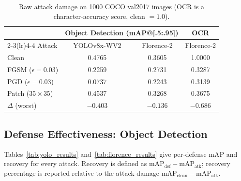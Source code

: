 \documentclass[10pt,twocolumn,letterpaper]{article}
\begin{document}
\begin{table}[t]
\centering
\small
\setlength{\tabcolsep}{4pt}
\begin{tabular}{lccc}
\toprule
 & \multicolumn{2}{c}{Object Detection (mAP@[.5:.95])} & OCR \\
\cmidrule(lr){2-3}\cmidrule(lr){4-4}
Attack & YOLOv8x-WV2 & Florence-2 & Florence-2 \\
\midrule
Clean              & 0.4765 & 0.3605 & 1.0000 \\
FGSM ($\epsilon{=}0.03$) & 0.2259 & 0.2731 & 0.3287 \\
PGD ($\epsilon{=}0.03$)  & 0.0737 & 0.2243 & 0.3139 \\
Patch ($35{\times}35$)   & 0.4537 & 0.3268 & 0.3675 \\
\midrule
$\Delta$ (worst) & $-0.403$ & $-0.136$ & $-0.686$ \\
\bottomrule
\end{tabular}
\caption{Raw attack damage on 1000 COCO val2017 images (OCR is a character-accuracy score, clean $=1.0$).}
\label{tab:attack_damage}
\end{table}

\subsection{Defense Effectiveness: Object Detection}
Tables~\ref{tab:yolo_results} and~\ref{tab:florence_results} give per-defense mAP and recovery for every attack. Recovery is defined as $\mathrm{mAP}_{\text{def}}-\mathrm{mAP}_{\text{atk}}$; recovery percentage is reported relative to the attack damage $\mathrm{mAP}_{\text{clean}}-\mathrm{mAP}_{\text{atk}}$.
\end{document}
